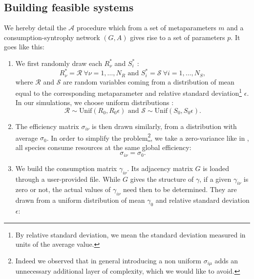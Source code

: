 \documentclass[12pt, titlepage]{report}
\begin{document}
\subsection{Building feasible systems}\label{sec : feasibility methods algorithmic procedure}
We hereby detail the $\mathcal{A}$ procedure which from a set of metaparameters $m$ and a consumption-syntrophy network $(G,A)$ gives rise to a set of parameters $p$. It goes like this:
\begin{enumerate}
  \item We first randomly draw each $R^*_\nu$
  and $S^*_i$ :
  \begin{equation}
     R^*_\nu = \mathcal{R} \ \forall \nu=1, \dots, N_R\text{ and }  S^*_i = \mathcal{S} \ \forall i=1, \dots, N_S,
  \end{equation}
  where $\mathcal{R}$ and $\mathcal{S}$ are random variables coming from a distribution of mean equal to the corresponding metaparameter and relative standard deviation\footnote{By relative standard deviation, we mean the standard deviation measured in units of the average value.} $\epsilon$. In our simulations, we choose uniform distributions :
  \begin{equation}
  \mathcal{R} \sim \text{Unif}(R_0, R_0 \epsilon) \text{ and } \mathcal{S} \sim \text{Unif}(S_0, S_0\epsilon).
  \end{equation}
  \item The efficiency matrix $\sigma_{i\nu}$ is then drawn similarly, from a distribution with average $\sigma_0$. In order to simplify the problem\footnote{Indeed we observed that in general introducing a non uniform $\sigma_{i\mu}$ adds an unnecessary additional layer of complexity, which we would like to avoid.}, we take a zero-variance like \citeauthor{butler_stability_2018} in \cite{butler_stability_2018}, \ie all species consume resources at the same global efficiency:
  \begin{equation}
    \sigma_{i\nu} = \sigma_0.
  \end{equation}
  \item We build the consumption matrix $\gamma_{i\nu}$. Its adjacency matrix $G$ is loaded through a user-provided file.
  While $G$ gives the structure of $\gamma$, \ie if a given $\gamma_{i\nu}$ is zero or not, the actual values of $\gamma_{i\nu}$ need then to be determined. They are drawn from a uniform distribution of mean $\gamma_0$ and relative standard deviation $\epsilon$:

\end{enumerate}
\end{document}

